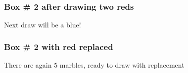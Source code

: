 \documentclass[handout]{beamer}
\begin{document}
   \begin{frame}
   \frametitle{Box \# 2 after drawing two reds}
   \begin{center}
   \end{center}
   Next draw will be a blue!
   \end{frame}



   \begin{frame}
   \frametitle{Box \# 2 with red replaced}
   \begin{center}
   \end{center}
   There are again 5 marbles, ready to draw with replacement
   \end{frame}

\end{document}
